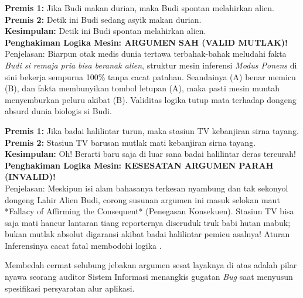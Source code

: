 \begin{contoh}
\textbf{Premis 1:} Jika Budi makan durian, maka Budi spontan melahirkan alien. \\
\textbf{Premis 2:} Detik ini Budi sedang asyik makan durian. \\
\textbf{Kesimpulan:} Detik ini Budi spontan melahirkan alien. \\
\textbf{Penghakiman Logika Mesin: ARGUMEN SAH (VALID MUTLAK)!} \\
Penjelasan: Biarpun otak medis dunia tertawa terbahak-bahak meludahi fakta \textit{Budi si remaja pria bisa beranak alien}, struktur mesin inferensi \textit{Modus Ponens} di sini bekerja sempurna 100\% tanpa cacat patahan. Seandainya (A) benar memicu (B), dan fakta membunyikan tombol letupan (A), maka pasti mesin muntah menyemburkan peluru akibat (B). Validitas logika tutup mata terhadap dongeng absurd dunia biologis si Budi.
\end{contoh}

\begin{contoh}
\textbf{Premis 1:} Jika badai halilintar turun, maka stasiun TV kebanjiran sirna tayang. \\
\textbf{Premis 2:} Stasiun TV barusan mutlak mati kebanjiran sirna tayang. \\
\textbf{Kesimpulan:} Oh! Berarti baru saja di luar sana badai halilintar deras tercurah! \\
\textbf{Penghakiman Logika Mesin: KESESATAN ARGUMEN PARAH (INVALID)!} \\
Penjelasan: Meskipun isi alam bahasanya terkesan nyambung dan tak sekonyol dongeng Lahir Alien Budi, corong susunan argumen ini masuk selokan maut *Fallacy of Affirming the Consequent* (Penegasan Konsekuen). Stasiun TV bisa saja mati hancur lantaran tiang reporternya diseruduk truk babi hutan mabuk; bukan mutlak absolut digaransi akibat badai halilintar pemicu asalnya! Aturan Inferensinya cacat fatal membodohi logika \cite{iep_natded}.
\end{contoh}
Membedah cermat selubung jebakan argumen sesat layaknya di atas adalah pilar nyawa seorang auditor Sistem Informasi menangkis gugatan \textit{Bug} saat menyusun spesifikasi persyaratan alur aplikasi. 
